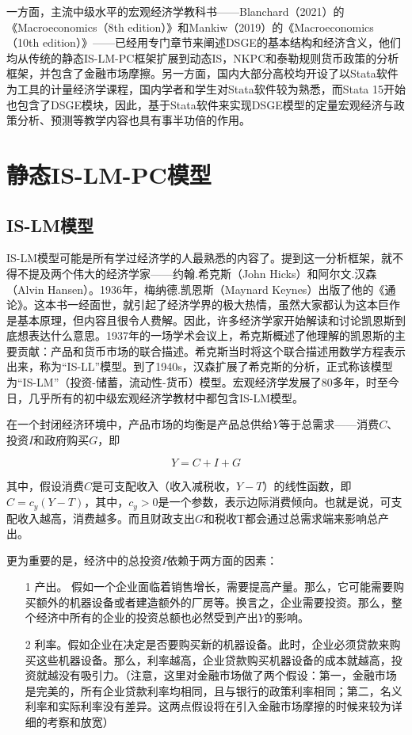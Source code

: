\documentclass[cn,12pt,math=newtx,citestyle=gb7714-2015,bibstyle=gb7714-2015]{elegantbook}
\begin{document}
	一方面，主流中级水平的宏观经济学教科书——Blanchard（2021）的《Macroeconomics（8th edition）》和Mankiw（2019）的《Macroeconomics（10th edition）》——已经用专门章节来阐述DSGE的基本结构和经济含义，他们均从传统的静态IS-LM-PC框架扩展到动态IS，NKPC和泰勒规则货币政策的分析框架，并包含了金融市场摩擦。另一方面，国内大部分高校均开设了以Stata软件为工具的计量经济学课程，国内学者和学生对Stata软件较为熟悉，而Stata 15开始也包含了DSGE模块，因此，基于Stata软件来实现DSGE模型的定量宏观经济与政策分析、预测等教学内容也具有事半功倍的作用。
	
	\section{静态IS-LM-PC模型}
	\subsection{IS-LM模型}
	IS-LM模型可能是所有学过经济学的人最熟悉的内容了。提到这一分析框架，就不得不提及两个伟大的经济学家——约翰.希克斯（John Hicks）和阿尔文.汉森（Alvin Hansen）。1936年，梅纳德.凯恩斯（Maynard Keynes）出版了他的《通论》。这本书一经面世，就引起了经济学界的极大热情，虽然大家都认为这本巨作是基本原理，但内容且很令人费解。因此，许多经济学家开始解读和讨论凯恩斯到底想表达什么意思。1937年的一场学术会议上，希克斯概述了他理解的凯恩斯的主要贡献：产品和货币市场的联合描述。希克斯当时将这个联合描述用数学方程表示出来，称为“IS-LL”模型。到了1940s，汉森扩展了希克斯的分析，正式称该模型为“IS-LM”（投资-储蓄，流动性-货币）模型。宏观经济学发展了80多年，时至今日，几乎所有的初中级宏观经济学教材中都包含IS-LM模型。
	
	在一个封闭经济环境中，产品市场的均衡是产品总供给$Y$等于总需求——消费$C$、投资$I$和政府购买$G$，即
	
	\begin{equation}
		Y = C + I + G
	\end{equation}
	
	其中，假设消费$C$是可支配收入（收入减税收，$Y-T$）的线性函数，即$C=c_y (Y-T)$，其中，$c_y>0$是一个参数，表示边际消费倾向。也就是说，可支配收入越高，消费越多。而且财政支出$G$和税收T都会通过总需求端来影响总产出。
	
	更为重要的是，经济中的总投资$I$依赖于两方面的因素：
	
	\begin{itemize}
		\item [1] 产出。 假如一个企业面临着销售增长，需要提高产量。那么，它可能需要购买额外的机器设备或者建造额外的厂房等。换言之，企业需要投资。那么，整个经济中所有的企业的投资总额也必然受到产出$Y$的影响。
		\item [2] 利率。假如企业在决定是否要购买新的机器设备。此时，企业必须贷款来购买这些机器设备。那么，利率越高，企业贷款购买机器设备的成本就越高，投资就越没有吸引力。（注意，这里对金融市场做了两个假设：第一，金融市场是完美的，所有企业贷款利率均相同，且与银行的政策利率相同；第二，名义利率和实际利率没有差异。这两点假设将在引入金融市场摩擦的时候来较为详细的考察和放宽）
	\end{itemize}
	
\end{document}
